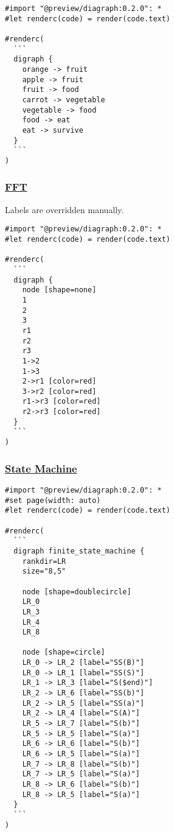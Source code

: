 \begin{verbatim}
#import "@preview/diagraph:0.2.0": *
#let renderc(code) = render(code.text)

#renderc(
  ```
  digraph {
    orange -> fruit
    apple -> fruit
    fruit -> food
    carrot -> vegetable
    vegetable -> food
    food -> eat
    eat -> survive
  }
  ```
)
\end{verbatim}

\pandocbounded{}

\subsubsection{\texorpdfstring{\hyperref[fft]{FFT}}{FFT}}\label{fft}

Labels are overridden manually.

\begin{verbatim}
#import "@preview/diagraph:0.2.0": *
#let renderc(code) = render(code.text)

#renderc(
  ```
  digraph {
    node [shape=none]
    1
    2
    3
    r1
    r2
    r3
    1->2
    1->3
    2->r1 [color=red]
    3->r2 [color=red]
    r1->r3 [color=red]
    r2->r3 [color=red]
  }
  ```
)
\end{verbatim}

\pandocbounded{}

\subsubsection{\texorpdfstring{\hyperref[state-machine]{State
Machine}}{State Machine}}\label{state-machine}

\begin{verbatim}
#import "@preview/diagraph:0.2.0": *
#set page(width: auto)
#let renderc(code) = render(code.text)

#renderc(
  ```
  digraph finite_state_machine {
    rankdir=LR
    size="8,5"

    node [shape=doublecircle]
    LR_0
    LR_3
    LR_4
    LR_8

    node [shape=circle]
    LR_0 -> LR_2 [label="SS(B)"]
    LR_0 -> LR_1 [label="SS(S)"]
    LR_1 -> LR_3 [label="S($end)"]
    LR_2 -> LR_6 [label="SS(b)"]
    LR_2 -> LR_5 [label="SS(a)"]
    LR_2 -> LR_4 [label="S(A)"]
    LR_5 -> LR_7 [label="S(b)"]
    LR_5 -> LR_5 [label="S(a)"]
    LR_6 -> LR_6 [label="S(b)"]
    LR_6 -> LR_5 [label="S(a)"]
    LR_7 -> LR_8 [label="S(b)"]
    LR_7 -> LR_5 [label="S(a)"]
    LR_8 -> LR_6 [label="S(b)"]
    LR_8 -> LR_5 [label="S(a)"]
  }
  ```
)
\end{verbatim}

